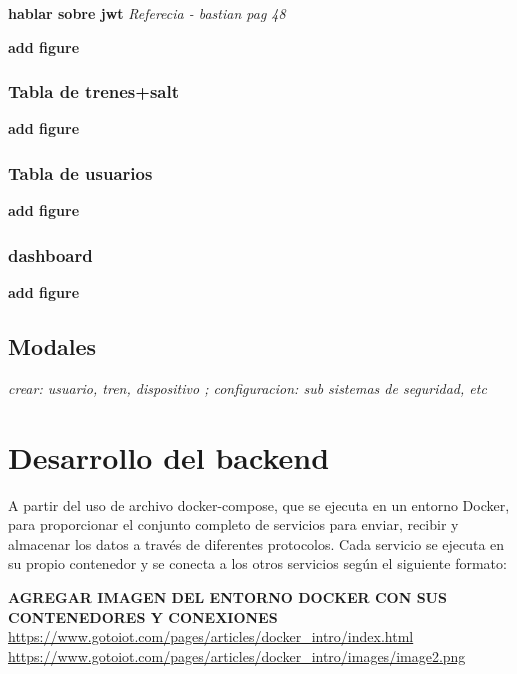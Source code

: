\textbf{hablar sobre jwt}
\textit{Referecia - bastian pag 48}

\textbf{add figure}


\subsubsection{Tabla de trenes+salt}

\textbf{add figure}


\subsubsection{Tabla de usuarios}

\textbf{add figure}


\subsubsection{dashboard}

\textbf{add figure}

\subsection{Modales}

\textit{crear: usuario, tren, dispositivo ; configuracion: sub sistemas de seguridad, etc}





\section{Desarrollo del backend}


A partir del uso de archivo docker-compose, que se ejecuta en un entorno Docker, para proporcionar el conjunto completo de servicios para enviar, recibir y almacenar los datos a través de diferentes protocolos. Cada servicio se ejecuta en su propio contenedor y se conecta a los otros servicios según el siguiente formato:


\textbf{AGREGAR IMAGEN DEL ENTORNO DOCKER CON SUS CONTENEDORES Y CONEXIONES }
\url{https://www.gotoiot.com/pages/articles/docker_intro/index.html}
\url{https://www.gotoiot.com/pages/articles/docker_intro/images/image2.png}


